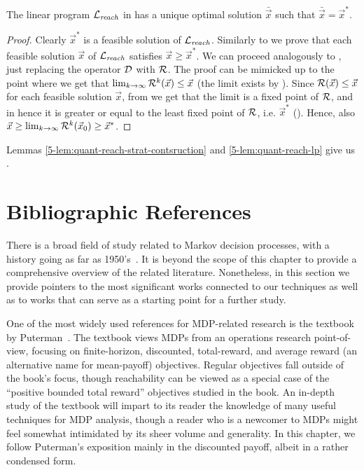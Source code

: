 \begin{lemma}
	\label{5-lem:quant-reach-lp}
	The linear program $\mathcal{L}_{\mathit{reach}}$ in  has a unique optimal solution 
	$\bar{\vec{x}}$ such that $\bar{\vec{x}} = \vec{x}^*$.
\end{lemma}
\begin{proof}
Clearly $\vec{x}^*$ is a feasible solution of $\mathcal{L}_{\mathit{reach}}$. Similarly to  we prove that each feasible solution $\vec{x}$ of $\mathcal{L}_{\mathit{reach}}$ satisfies $\vec{x}\geq \vec{x}^*$. We can proceed analogously  to , just replacing the operator $\mathcal{D}$ with $\mathcal{R}$. The proof can be mimicked up to the point where we get that $\lim_{k\rightarrow \infty} \mathcal{R}^k (\vec{x}) \leq \vec{x}$ (the limit exists by ). Since $\mathcal{R}(\vec{x})\leq \vec{x}$ for each feasible solution $\vec{x}$, from  we get that the limit is a fixed point of $\mathcal{R}$, and in hence it is greater or equal to the least fixed point of $\mathcal{R}$, i.e. $\vec{x}^*$ (). Hence, also $\vec{x} \geq \lim_{k\rightarrow \infty} \mathcal{R}^k (\vec{x}_0)\geq \vec{x}^*$. 
\end{proof}

\noindent
Lemmas \ref{5-lem:quant-reach-strat-contsruction} and \ref{5-lem:quant-reach-lp} give us .

\section*{Bibliographic References}

There is a broad field of study related to Markov decision processes, with a history going as far as  1950's~\cite{Bellman:1957}. It is beyond the scope of this chapter to provide a comprehensive overview of the related literature. Nonetheless, in this section we provide pointers to the most significant works connected to our techniques as well as to works that can serve as a starting point for a further study.

One of the most widely used references for MDP-related research is the textbook by Puterman~\cite{Puterman:2005}. The textbook views MDPs from an operations research point-of-view, focusing on finite-horizon, discounted, total-reward, and average reward (an alternative name for mean-payoff) objectives. Regular objectives fall outside of the book's focus, though reachability can be viewed as a special case of the ``positive bounded total reward'' objectives studied in the book. An in-depth study of the textbook will impart to its reader the knowledge of many useful techniques for MDP analysis, though a reader who is a newcomer to MDPs might feel somewhat intimidated by its sheer volume and generality. In this chapter, we follow Puterman's exposition mainly in the discounted payoff, albeit in a rather condensed form. 


